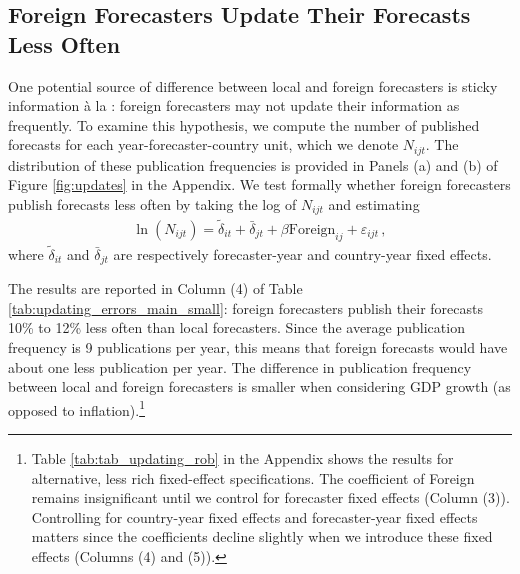 
\subsection{Foreign Forecasters Update Their Forecasts Less Often}

One potential source of difference between local and foreign forecasters is sticky information à la \citet{MankiwReis2002}: foreign forecasters may not update their information as frequently. To examine this hypothesis, we compute the number of published forecasts for each year-forecaster-country unit, which we denote $N_{ijt}$. The distribution of these publication frequencies is provided in Panels (a) and (b) of Figure \ref{fig:updates} in the Appendix.
We test formally whether foreign forecasters publish forecasts less often by taking the log of $N_{ijt}$ and estimating
\begin{align}
	\ln(N_{ijt}) = \tilde\delta_{it} + \bar{\delta}_{jt} +
\beta \text{Foreign}_{ij} + \varepsilon_{ijt}  \,, \label{eq:regN}
\end{align}
where  $\tilde\delta_{it} $ and $\bar{\delta}_{jt} $ are respectively forecaster-year and country-year fixed effects.%

The results are reported in Column (4) of Table \ref{tab:updating_errors_main_small}: foreign forecasters publish their forecasts 10\% to 12\% less often than local forecasters. Since the average publication frequency is 9 publications per year, this means that foreign forecasts would have about one less publication per year. The difference in publication frequency between local and foreign forecasters is smaller when considering GDP growth (as opposed to inflation).\footnote{Table \ref{tab:tab_updating_rob} in the Appendix shows the results for alternative, less rich fixed-effect specifications. The coefficient of Foreign remains insignificant until we control for forecaster fixed effects (Column (3)). Controlling for country-year fixed effects and forecaster-year fixed effects matters since the coefficients decline slightly when we introduce these fixed effects (Columns (4) and (5)).}


